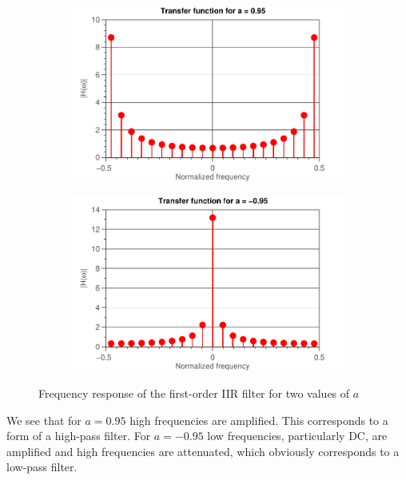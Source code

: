 \documentclass[11pt,titlepage]{report}
\begin{document}
\begin{figure}[H]
	\centering
	\begin{subfigure}{0.49\textwidth}
		\includegraphics[width=\textwidth]{../../deliverable-7-resources/figures/ass-1/report-2/ass-1-report-2-a-positive-spectrum.pdf}
	\end{subfigure}
	\begin{subfigure}{0.49\textwidth}
		\includegraphics[width=\textwidth]{../../deliverable-7-resources/figures/ass-1/report-2/ass-1-report-2-a-negative-spectrum.pdf}
	\end{subfigure}
	\caption{Frequency response of the first-order IIR filter for two values of $a$}
	\label{fig:ass-1-rep-2-z}
\end{figure}

We see that for $a=0.95$ high frequencies are amplified. This corresponds to a form of a high-pass filter. For $a=-0.95$ low frequencies, particularly DC, are amplified and high frequencies are attenuated, which obviously corresponds to a low-pass filter.
\end{document}
